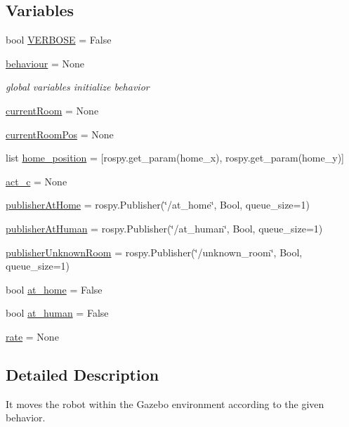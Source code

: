\subsection*{Variables}
\begin{DoxyCompactItemize}
\item 
bool \hyperlink{namespacemotion_a9f9cd0f38a0aad33b5304b4edef120cd}{V\+E\+R\+B\+O\+SE} = False
\item 
\hyperlink{namespacemotion_a15d63b2a70ac940f179085ce72871c86}{behaviour} = None
\begin{DoxyCompactList}\small\item\em global variables initialize behavior \end{DoxyCompactList}\item 
\hyperlink{namespacemotion_ac7315ec450891f4f81a17315dccc7903}{current\+Room} = None
\item 
\hyperlink{namespacemotion_a635c1fd35291e93dc73ab2f6c6f7c8c4}{current\+Room\+Pos} = None
\item 
list \hyperlink{namespacemotion_aa995e8257b20bb286a59bf6bb3c5f375}{home\+\_\+position} = \mbox{[}rospy.\+get\+\_\+param(\textquotesingle{}home\+\_\+x\textquotesingle{}), rospy.\+get\+\_\+param(\textquotesingle{}home\+\_\+y\textquotesingle{})\mbox{]}
\item 
\hyperlink{namespacemotion_aba6af569cf57bbdc8a1d01598d29d99b}{act\+\_\+c} = None
\item 
\hyperlink{namespacemotion_aa7760f4160a77a04d3cc60233ad138ab}{publisher\+At\+Home} = rospy.\+Publisher(\char`\"{}/at\+\_\+home\char`\"{}, Bool, queue\+\_\+size=1)
\item 
\hyperlink{namespacemotion_a11a206a594fcaf6dff8429664bcce376}{publisher\+At\+Human} = rospy.\+Publisher(\char`\"{}/at\+\_\+human\char`\"{}, Bool, queue\+\_\+size=1)
\item 
\hyperlink{namespacemotion_ac08467b50a1ebb7e985d8b93bcf5653d}{publisher\+Unknown\+Room} = rospy.\+Publisher(\char`\"{}/unknown\+\_\+room\char`\"{}, Bool, queue\+\_\+size=1)
\item 
bool \hyperlink{namespacemotion_a30e58643e988d1faddb84cdfd54965f8}{at\+\_\+home} = False
\item 
bool \hyperlink{namespacemotion_a8a70e4c3b029440acf94460c95f42841}{at\+\_\+human} = False
\item 
\hyperlink{namespacemotion_a86619454560e5d6f8dfe5dd042391ca1}{rate} = None
\end{DoxyCompactItemize}


\subsection{Detailed Description}
It moves the robot within the Gazebo environment according to the given behavior. 

